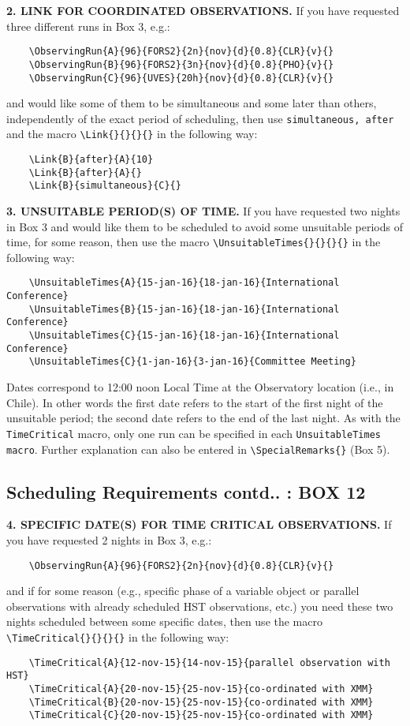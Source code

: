\documentclass{article}
\begin{document}
\medskip

{\bf 2.  LINK FOR COORDINATED OBSERVATIONS.} If you have requested
three different runs in Box 3, e.g.:
\begin{verbatim}
    \ObservingRun{A}{96}{FORS2}{2n}{nov}{d}{0.8}{CLR}{v}{}
    \ObservingRun{B}{96}{FORS2}{3n}{nov}{d}{0.8}{PHO}{v}{}
    \ObservingRun{C}{96}{UVES}{20h}{nov}{d}{0.8}{CLR}{v}{}
\end{verbatim}
and would like some of them to be simultaneous and some later than
others, independently of the exact period of scheduling, then use
\verb|simultaneous, after| and the macro \verb|\Link{}{}{}{}| in the
following way:
\begin{verbatim}
    \Link{B}{after}{A}{10}
    \Link{B}{after}{A}{}
    \Link{B}{simultaneous}{C}{}
\end{verbatim}

\medskip

{\bf 3. UNSUITABLE PERIOD(S) OF TIME.}  If you have requested two
nights in Box 3 and would like them to be scheduled to avoid some
unsuitable periods of time, for some reason, then use the macro
\verb|\UnsuitableTimes{}{}{}{}| in the following way:
\begin{verbatim}
    \UnsuitableTimes{A}{15-jan-16}{18-jan-16}{International Conference}
    \UnsuitableTimes{B}{15-jan-16}{18-jan-16}{International Conference}
    \UnsuitableTimes{C}{15-jan-16}{18-jan-16}{International Conference}
    \UnsuitableTimes{C}{1-jan-16}{3-jan-16}{Committee Meeting}
\end{verbatim}

Dates correspond to 12:00 noon Local Time at
the Observatory location (i.e., in Chile).
In other words the first date refers to the start of the first night
of the unsuitable period; the second date refers to the end of the last night.
As with the \verb|TimeCritical| macro, only one run can be specified in each
\verb|UnsuitableTimes macro|. 
Further explanation can also be entered in  \verb|\SpecialRemarks{}| (Box 5).

\subsection{Scheduling Requirements contd.. : {\bf BOX 12}}
\label{sec:timecrit}

{\bf 4. SPECIFIC DATE(S) FOR TIME CRITICAL  OBSERVATIONS.} If you have
requested 2 nights in Box 3, e.g.:
\begin{verbatim}
    \ObservingRun{A}{96}{FORS2}{2n}{nov}{d}{0.8}{CLR}{v}{} 
\end{verbatim}
and if for some reason (e.g., specific phase of a variable object
or parallel observations with already scheduled HST observations,
etc.)  you need these two nights scheduled between some specific
dates, then use the macro \verb|\TimeCritical{}{}{}{}| in the
following way:
\begin{verbatim}
    \TimeCritical{A}{12-nov-15}{14-nov-15}{parallel observation with HST}
    \TimeCritical{A}{20-nov-15}{25-nov-15}{co-ordinated with XMM}     
    \TimeCritical{B}{20-nov-15}{25-nov-15}{co-ordinated with XMM}
    \TimeCritical{C}{20-nov-15}{25-nov-15}{co-ordinated with XMM}
\end{verbatim}
\end{document}
